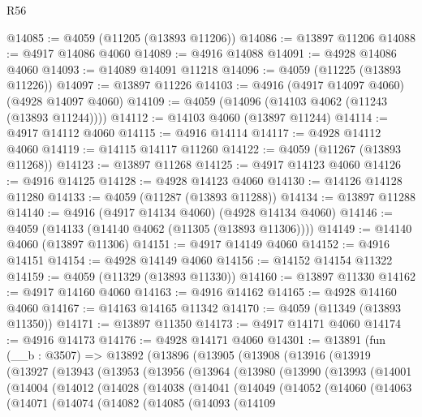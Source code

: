 \begin{lexlean}{R56}
\begin{coremodule}
@14085 := @4059 (@11205 (@13893 @11206))
@14086 := @13897 @11206
@14088 := @4917 @14086 @4060
@14089 := @4916 @14088
@14091 := @4928 @14086 @4060
@14093 := @14089 @14091 @11218
@14096 := @4059 (@11225 (@13893 @11226))
@14097 := @13897 @11226
@14103 := @4916 (@4917 @14097 @4060) (@4928 @14097 @4060)
@14109 := @4059 (@14096 (@14103 @4062 (@11243 (@13893 @11244))))
@14112 := @14103 @4060 (@13897 @11244)
@14114 := @4917 @14112 @4060
@14115 := @4916 @14114
@14117 := @4928 @14112 @4060
@14119 := @14115 @14117 @11260
@14122 := @4059 (@11267 (@13893 @11268))
@14123 := @13897 @11268
@14125 := @4917 @14123 @4060
@14126 := @4916 @14125
@14128 := @4928 @14123 @4060
@14130 := @14126 @14128 @11280
@14133 := @4059 (@11287 (@13893 @11288))
@14134 := @13897 @11288
@14140 := @4916 (@4917 @14134 @4060) (@4928 @14134 @4060)
@14146 := @4059 (@14133 (@14140 @4062 (@11305 (@13893 @11306))))
@14149 := @14140 @4060 (@13897 @11306)
@14151 := @4917 @14149 @4060
@14152 := @4916 @14151
@14154 := @4928 @14149 @4060
@14156 := @14152 @14154 @11322
@14159 := @4059 (@11329 (@13893 @11330))
@14160 := @13897 @11330
@14162 := @4917 @14160 @4060
@14163 := @4916 @14162
@14165 := @4928 @14160 @4060
@14167 := @14163 @14165 @11342
@14170 := @4059 (@11349 (@13893 @11350))
@14171 := @13897 @11350
@14173 := @4917 @14171 @4060
@14174 := @4916 @14173
@14176 := @4928 @14171 @4060
@14301 := @13891
    (fun (__b : @3507) =>
    @13892
      (@13896
        (@13905
          (@13908
            (@13916
              (@13919
                (@13927
                  (@13943
                    (@13953
                      (@13956
                        (@13964
                          (@13980
                            (@13990
                              (@13993
                                (@14001
                                  (@14004
                                    (@14012
                                      (@14028
                                        (@14038
                                          (@14041
                                            (@14049
                                              (@14052
                                                (@14060
                                                  (@14063
                                                    (@14071
                                                      (@14074
                                                        (@14082
                                                          (@14085
                                                            (@14093
                                                              (@14109

\end{coremodule}
\end{lexlean}
